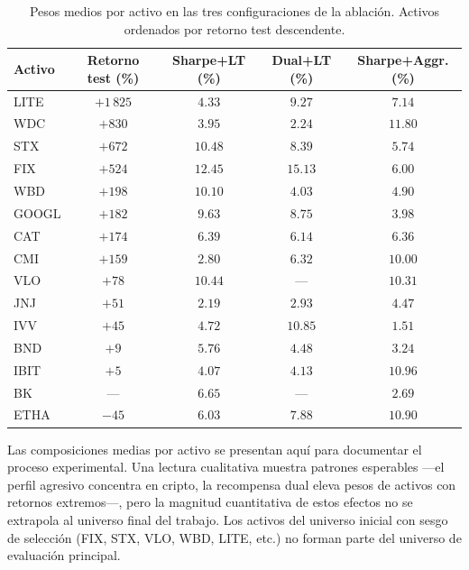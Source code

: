 \documentclass[IB,a4paper]{TFUOC}
\begin{document}
\begin{table}[h]
\centering
\renewcommand{\arraystretch}{1.20}
\begin{tabular}{|l|c|c|c|c|}
\hline
\textbf{Activo} & \textbf{Retorno test (\%)} & \textbf{Sharpe+LT (\%)} & \textbf{Dual+LT (\%)} & \textbf{Sharpe+Aggr. (\%)} \\ \hline
LITE  & $+1\,825$ & $4.33$  & $9.27$  & $7.14$  \\ \hline
WDC   & $+830$    & $3.95$  & $2.24$  & $11.80$ \\ \hline
STX   & $+672$    & $10.48$ & $8.39$  & $5.74$  \\ \hline
FIX   & $+524$    & $12.45$ & $15.13$ & $6.00$  \\ \hline
WBD   & $+198$    & $10.10$ & $4.03$  & $4.90$  \\ \hline
GOOGL & $+182$    & $9.63$  & $8.75$  & $3.98$  \\ \hline
CAT   & $+174$    & $6.39$  & $6.14$  & $6.36$  \\ \hline
CMI   & $+159$    & $2.80$  & $6.32$  & $10.00$ \\ \hline
VLO   & $+78$     & $10.44$ & ---     & $10.31$ \\ \hline
JNJ   & $+51$     & $2.19$  & $2.93$  & $4.47$  \\ \hline
IVV   & $+45$     & $4.72$  & $10.85$ & $1.51$  \\ \hline
BND   & $+9$      & $5.76$  & $4.48$  & $3.24$  \\ \hline
IBIT  & $+5$      & $4.07$  & $4.13$  & $10.96$ \\ \hline
BK    & ---       & $6.65$  & ---     & $2.69$  \\ \hline
ETHA  & $-45$     & $6.03$  & $7.88$  & $10.90$ \\ \hline
\end{tabular}
\caption[Pesos medios por activo en la ablación iteración 1.]{Pesos medios por activo en las tres configuraciones de la ablación. Activos ordenados por retorno test descendente.}
\label{tab:pesos_iter2}
\end{table}

\noindent Las composiciones medias por activo se presentan aquí para documentar el proceso experimental. Una lectura cualitativa muestra patrones esperables ---el perfil agresivo concentra en cripto, la recompensa dual eleva pesos de activos con retornos extremos---, pero la magnitud cuantitativa de estos efectos no se extrapola al universo final del trabajo. Los activos del universo inicial con sesgo de selección (FIX, STX, VLO, WBD, LITE, etc.) no forman parte del universo de evaluación principal.
\end{document}
